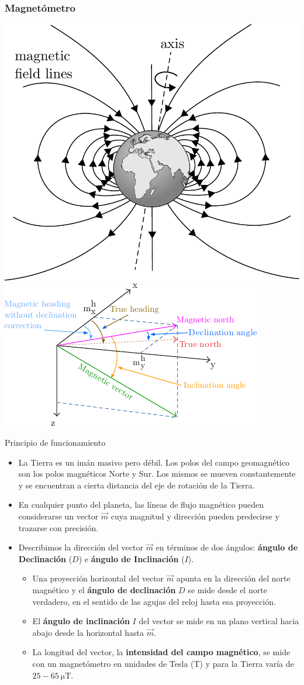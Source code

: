\begin{frame}
    \frametitle{Magnetómetro}
    \begin{center}
        \includegraphics[width=0.2\columnwidth]{images/earth_magnetic_field.pdf}
        \hspace{1cm}
        \includegraphics[width=0.3\columnwidth]{images/magnetic_field.pdf}
    \end{center}
    \scriptsize
    \begin{block}{Principio de funcionamiento}
        \begin{itemize}
            
            \item La Tierra es un imán masivo pero débil. Los polos del campo geomagnético son los polos magnéticos Norte y Sur. Los mismos se mueven constantemente y se encuentran a cierta distancia del eje de rotación de la Tierra.
    
            \item En cualquier punto del planeta, las líneas de flujo magnético pueden considerarse un vector $\vec{m}$ cuya magnitud y dirección pueden predecirse y trazarse con precisión.
            
            \item Describimos la dirección del vector $\vec{m}$ en términos de dos ángulos: \textbf{ángulo de Declinación} ($D$) e \textbf{ángulo de Inclinación} ($I$).
            
            \begin{itemize}
                \scriptsize
                \item Una proyección horizontal del vector $\vec{m}$ apunta en la dirección del norte magnético y el \textbf{ángulo de declinación} $D$ se mide desde el norte verdadero, en el sentido de las agujas del reloj hasta esa proyección.
            
                \item El \textbf{ángulo de inclinación} $I$ del vector se mide en un plano vertical hacia abajo desde la horizontal hasta $\vec{m}$.
                
                \item La longitud del vector, la \textbf{intensidad del campo magnético}, se mide con un magnetómetro en unidades de Tesla (T) y para la Tierra varía de $25-\SI{65}{\micro\tesla}$.
            \end{itemize}
        \end{itemize}
    \end{block}
\end{frame}


